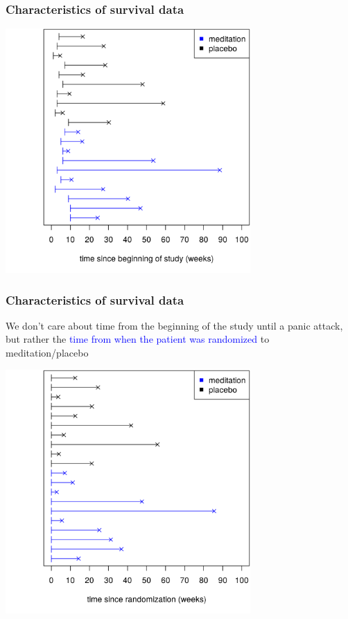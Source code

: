 \documentclass[10pt,t]{beamer}
\begin{document}
\begin{frame}
\frametitle{Characteristics of survival data}
\centering
\includegraphics[width=0.7\textwidth]{figs/meditation_observed_study_time.png}
\end{frame}

\begin{frame}
\frametitle{Characteristics of survival data}
\vspace{-0.8cm}
We don't care about time from the beginning of the study until a panic attack, but rather the \textcolor{blue}{time from when the patient was randomized} to meditation/placebo
\begin{center}
\includegraphics[width=0.7\textwidth]{figs/meditation_observed_rand_time.png}
\end{center}
\end{frame}
\end{document}
